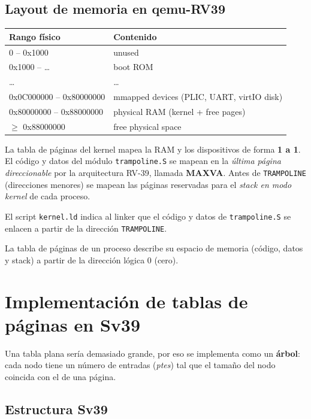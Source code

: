 \documentclass[11pt,a4paper]{article}
\begin{document}
\subsection{Layout de memoria en qemu-RV39}

\begin{center}
\small
\begin{tabular}{@{}ll@{}}
\toprule
\textbf{Rango físico} & \textbf{Contenido} \\
\midrule
0 -- 0x1000        & unused \\
0x1000 -- \ldots   & boot ROM \\
\ldots             & \ldots \\
0x0C000000 -- 0x80000000 & mmapped devices (PLIC, UART, virtIO disk) \\
0x80000000 -- 0x88000000 & physical RAM (kernel + free pages) \\
$\geq$ 0x88000000  & free physical space \\
\bottomrule
\end{tabular}
\end{center}

La tabla de páginas del kernel mapea la RAM y los dispositivos de
forma \textbf{1 a 1}. El código y datos del módulo \texttt{trampoline.S}
se mapean en la \emph{última página direccionable} por la arquitectura
RV-39, llamada \textbf{MAXVA}. Antes de \texttt{TRAMPOLINE}
(direcciones menores) se mapean las páginas reservadas para el
\emph{stack en modo kernel} de cada proceso.

El script \texttt{kernel.ld} indica al linker que el código y datos
de \texttt{trampoline.S} se enlacen a partir de la dirección
\texttt{TRAMPOLINE}.

La tabla de páginas de un proceso describe su espacio de memoria
(código, datos y stack) a partir de la dirección lógica 0 (cero).

\section{Implementación de tablas de páginas en Sv39}

Una tabla plana sería demasiado grande, por eso se implementa como un
\textbf{árbol}: cada nodo tiene un número de entradas (\emph{ptes})
tal que el tamaño del nodo coincida con el de una página.

\subsection{Estructura Sv39}
\end{document}
